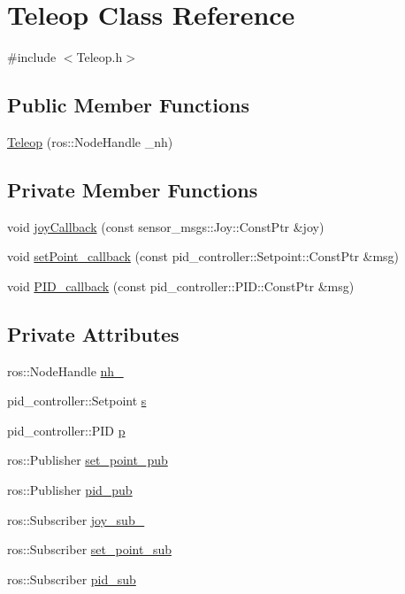 \hypertarget{classTeleop}{}\section{Teleop Class Reference}
\label{classTeleop}


{\ttfamily \#include $<$Teleop.\+h$>$}

\subsection*{Public Member Functions}
\begin{DoxyCompactItemize}
\item 
\hyperlink{classTeleop_aedd7150bd38dea9ca1298b8844d993bb}{Teleop} (ros\+::\+Node\+Handle \+\_\+nh)
\end{DoxyCompactItemize}
\subsection*{Private Member Functions}
\begin{DoxyCompactItemize}
\item 
void \hyperlink{classTeleop_a01e7ffc6e41c9689db9fbd2949907d08}{joy\+Callback} (const sensor\+\_\+msgs\+::\+Joy\+::\+Const\+Ptr \&joy)
\item 
void \hyperlink{classTeleop_ad9ca451dad6a3198badfb083592768cd}{set\+Point\+\_\+callback} (const pid\+\_\+controller\+::\+Setpoint\+::\+Const\+Ptr \&msg)
\item 
void \hyperlink{classTeleop_a3e2f30fad57672bd874064a2aff64fd5}{P\+I\+D\+\_\+callback} (const pid\+\_\+controller\+::\+P\+I\+D\+::\+Const\+Ptr \&msg)
\end{DoxyCompactItemize}
\subsection*{Private Attributes}
\begin{DoxyCompactItemize}
\item 
ros\+::\+Node\+Handle \hyperlink{classTeleop_af6234c346978403478d675643da6d270}{nh\+\_\+}
\item 
pid\+\_\+controller\+::\+Setpoint \hyperlink{classTeleop_acd8dbaa38d60a2d117b01e252226890f}{s}
\item 
pid\+\_\+controller\+::\+P\+ID \hyperlink{classTeleop_afd129737dc88767ba5ce6c9dbc590efc}{p}
\item 
ros\+::\+Publisher \hyperlink{classTeleop_a4b9594e5dc146900827a189715d9e823}{set\+\_\+point\+\_\+pub}
\item 
ros\+::\+Publisher \hyperlink{classTeleop_afe6012676dc5c8965e778b5e6752cbc7}{pid\+\_\+pub}
\item 
ros\+::\+Subscriber \hyperlink{classTeleop_a80e28e0147df3cd82570c4d3d1453a61}{joy\+\_\+sub\+\_\+}
\item 
ros\+::\+Subscriber \hyperlink{classTeleop_a8044683497c413df0697e6dbeeda6ff6}{set\+\_\+point\+\_\+sub}
\item 
ros\+::\+Subscriber \hyperlink{classTeleop_a8c8ea7486e955d44190675b2e2c6b090}{pid\+\_\+sub}
\end{DoxyCompactItemize}


